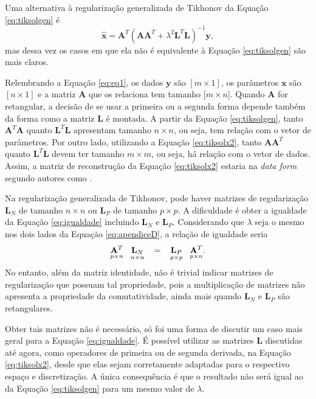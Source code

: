 Uma alternativa à regularização generalizada de Tikhonov da Equação \eqref{eq:tiksolgen} é 
\begin{equation}
\hat{\mathbf{x}} =\mathbf{A}^T \left( \mathbf{A} \mathbf{A}^T + \lambda^2 \mathbf{L}^T \mathbf{L} \right)^{-1} \mathbf{y},
\label{eq:tiksolx2}
\end{equation}
mas dessa vez os casos em que ela não é equivalente à Equação \eqref{eq:tiksolgen} são mais claros.

 Relembrando a Equação \eqref{eq:eq1}, os dados $\mathbf{y}$ são $[m \times 1]$, os parâmetros $\mathbf{x}$ são $[n \times 1]$ e a matriz $\mathbf{A}$ que os relaciona tem tamanho [$m \times n$].  Quando $\mathbf{A}$ for retangular, a decisão de se usar a primeira ou a segunda forma depende também da forma como a matriz $\mathbf{L}$ é montada. A partir da Equação \eqref{eq:tiksolgen}, tanto $\mathbf{A}^T \mathbf{A} $ quanto $\mathbf{L}^T \mathbf{L}$ apresentam tamanho $n \times n$, ou seja, tem relação com o vetor de parâmetros. Por outro lado, utilizando a Equação \eqref{eq:tiksolx2}, tanto $\mathbf{A} \mathbf{A}^T$ quanto $ \mathbf{L}^T \mathbf{L}$ devem ter tamanho $m \times m$, ou seja, há relação com o vetor de dados. Assim, a matriz de reconstrução da Equação \eqref{eq:tiksolx2} estaria na \textit{data form} segundo autores como \cite{Adler2009}.
 
 Na regularização generalizada de Tikhonov, pode haver  matrizes de regularização $\mathbf{L}_N$ de tamanho $n \times n$ ou $\mathbf{L}_P$ de tamanho $p \times p$. A dificuldade é obter a igualdade da Equação \eqref{eq:igualdade} incluindo $\mathbf{L}_N$ e $\mathbf{L}_P$. Considerando que $\lambda$ seja o mesmo nos dois lados da Equação \eqref{eq:apendiceD}, a relação de igualdade seria
\begin{equation}
 \underset{p \times n}{\mathbf{A}^T}\hspace{3mm}   \underset{n \times n}{\mathbf{L}_N} \hspace{3mm} = \hspace{3mm} \underset{p \times p}{\mathbf{L}_P}  \hspace{3mm} \underset{p \times n}{\mathbf{A}^T}. 
\end{equation}
No entanto, além da matriz identidade, não é trivial indicar matrizes de regularização que possuam tal propriedade, pois a multiplicação de matrizes não apresenta a propriedade da comutatividade, ainda mais quando  $\mathbf{L}_N$ e $\mathbf{L}_P$ são retangulares. 

Obter tais matrizes não é necessário, só foi uma forma de discutir um caso mais geral para a Equação \eqref{eq:igualdade}. É possível utilizar as matrizes $\mathbf{L}$ discutidas até agora, como operadores de primeira ou de segunda derivada, na Equação \eqref{eq:tiksolx2}, desde que elas sejam corretamente adaptadas para o respectivo espaço e discretização. A única consequência é que o resultado não será igual ao da Equação \ref{eq:tiksolgen} para um mesmo valor de $\lambda$. 




